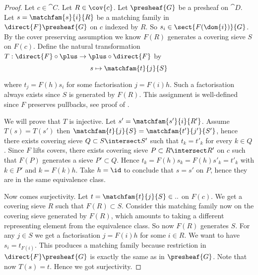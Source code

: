 
\begin{proof}
Let $c \in \cat{C}$.
Let $R \in \cov{c}$.
Let $\presheaf{G}$ be a presheaf on $\cat{D}$.
Let $s = \matchfam{s}{i}{R}$ be a matching family in $\direct{F}\presheaf{G}$ 
on $c$ indexed by $R$. So $s_i \in \sect{F(\dom{i})}{G}$.
By the cover preserving assumption we know $F(R)$ generates a covering sieve $S$ on $F(c)$.
Define the natural transformation $T: \direct{F}\circ \plus \rightarrow \plus \circ \direct{F}$ by 
\[ s \mapsto \matchfam{t}{j}{S} \]

where $t_j = F(h)s_i$ for some factorisation $j=F(i)h$. 
Such a factorisation always exists since $S$ is generated by $F(R)$.
This assignment is well-defined since $F$ preserves pullbacks, see proof of \cite[Lemma 2.3.3]{elephant}.

We will prove that $T$ is injective.
Let $s' = \matchfam{s'}{i}{R'}$.
Assume $T(s)=T(s')$
then $\matchfam{t}{j}{S} = \matchfam{t'}{j'}{S'}$,
hence there exists covering sieve $Q \subset S\intersect S'$
such that $t_k = t'_k$ for every $k\in Q$.
Since $F$ lifts covers, there exists covering sieve $P\subset R\intersect R'$ on $c$
such that $F(P)$ generates a sieve $P'\subset Q$.
Hence $t_k = F(h)s_k = F(h)s'_k = t'_k$ with $k\in P'$ and $k=F(k)h$.
Take $h=\id$ to conclude that $s=s'$ on $P$, hence they are in the same equivalence class.

Now comes surjectivity.
Let $t = \matchfam{t}{j}{S}\in..$ on $F(c)$.
We get a covering sieve $R$ such that $F(R)\subset S$.
Consider this matching family now on the covering sieve generated by $F(R)$, which amounts to taking a different representing element from the equivalence class. So now $F(R)$ generates $S$.
For any $j\in S$ we get a factorisation $j=F(i)h$ for some $i\in R$.
We want to have $s_i = t_{F(i)}$. 
This produces a matching family because restriction in $\direct{F}\presheaf{G}$ is exactly the same as in $\presheaf{G}$.
Note that now $T(s) = t$. Hence we got surjectivity.
\end{proof}

